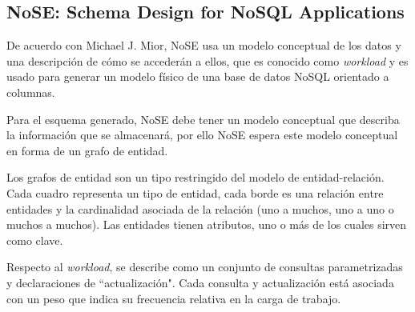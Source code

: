 \newpage\subsection{NoSE: Schema Design for NoSQL Applications}
De acuerdo con Michael J. Mior\cite{mior_nose_2017}, NoSE usa un modelo conceptual de los datos y una descripción de cómo se accederán a ellos, que es conocido como \textit{workload} y es usado para generar un modelo físico de una base de datos NoSQL orientado a columnas.


Para el esquema generado, NoSE debe tener un modelo conceptual que describa la información que se almacenará, por ello NoSE espera este modelo conceptual en forma de un grafo de entidad.


Los grafos de entidad son un tipo restringido del modelo de entidad-relación. Cada cuadro representa un tipo de entidad, cada borde es una relación entre entidades y la cardinalidad asociada de la relación (uno a muchos, uno a uno o muchos a muchos). Las entidades tienen atributos, uno o más de los cuales sirven como clave. 


Respecto al \textit{workload}, se describe como un conjunto de consultas parametrizadas y declaraciones de ``actualización". Cada consulta y actualización está asociada con un peso que indica su frecuencia relativa en la carga de trabajo.